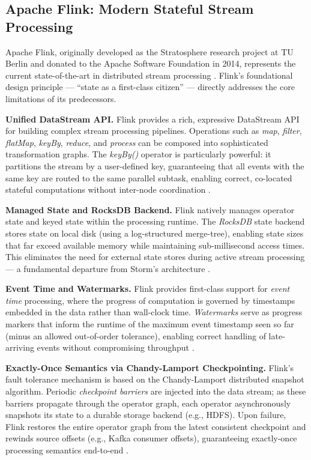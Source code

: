 \vspace{0.25cm}

\subsection{Apache Flink: Modern Stateful Stream Processing}
\begin{justify}
    Apache Flink, originally developed as the Stratosphere research project at TU Berlin and donated to the Apache Software Foundation in 2014, represents the current state-of-the-art in distributed stream processing \cite{[9]}. Flink's foundational design principle — ``state as a first-class citizen'' — directly addresses the core limitations of its predecessors.

    \textbf{Unified DataStream API.} Flink provides a rich, expressive DataStream API for building complex stream processing pipelines. Operations such as \textit{map}, \textit{filter}, \textit{flatMap}, \textit{keyBy}, \textit{reduce}, and \textit{process} can be composed into sophisticated transformation graphs. The \textit{keyBy()} operator is particularly powerful: it partitions the stream by a user-defined key, guaranteeing that all events with the same key are routed to the same parallel subtask, enabling correct, co-located stateful computations without inter-node coordination \cite{[10]}.

    \textbf{Managed State and RocksDB Backend.} Flink natively manages operator state and keyed state within the processing runtime. The \textit{RocksDB} state backend stores state on local disk (using a log-structured merge-tree), enabling state sizes that far exceed available memory while maintaining sub-millisecond access times. This eliminates the need for external state stores during active stream processing — a fundamental departure from Storm's architecture \cite{[11]}.

    \textbf{Event Time and Watermarks.} Flink provides first-class support for \textit{event time} processing, where the progress of computation is governed by timestamps embedded in the data rather than wall-clock time. \textit{Watermarks} serve as progress markers that inform the runtime of the maximum event timestamp seen so far (minus an allowed out-of-order tolerance), enabling correct handling of late-arriving events without compromising throughput \cite{[12]}.

    \textbf{Exactly-Once Semantics via Chandy-Lamport Checkpointing.} Flink's fault tolerance mechanism is based on the Chandy-Lamport distributed snapshot algorithm. Periodic \textit{checkpoint barriers} are injected into the data stream; as these barriers propagate through the operator graph, each operator asynchronously snapshots its state to a durable storage backend (e.g., HDFS). Upon failure, Flink restores the entire operator graph from the latest consistent checkpoint and rewinds source offsets (e.g., Kafka consumer offsets), guaranteeing exactly-once processing semantics end-to-end \cite{[9]}.
\end{justify}

